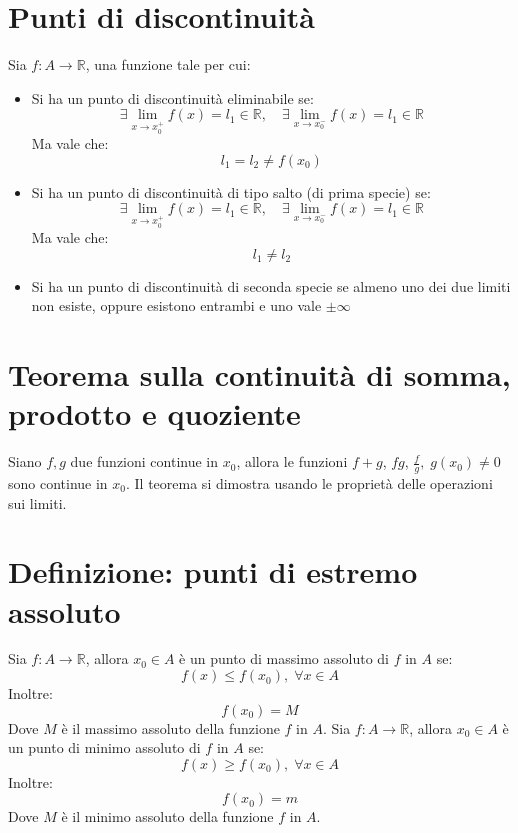 \documentclass[a4paper,12pt,openright]{book}
\begin{document}
    \section{Punti di discontinuità}
    Sia $f: A \longrightarrow \mathbb{R}$, una funzione tale per cui:
    \begin{itemize}
        \item Si ha un punto di discontinuità eliminabile se:
        \[\exists \lim_{x \rightarrow x_0^+} f(x) = l_1 \in \mathbb{R}, \quad \exists \lim_{x \rightarrow x_0^-} f(x) = l_1 \in \mathbb{R}\]
        Ma vale che:
        \[l_1 = l_2 \not = f(x_0)\]
        \item Si ha un punto di discontinuità di tipo salto (di prima specie) se:
        \[\exists \lim_{x \rightarrow x_0^+} f(x) = l_1 \in \mathbb{R}, \quad \exists \lim_{x \rightarrow x_0^-} f(x) = l_1 \in \mathbb{R}\]
        Ma vale che:
        \[l_1 \not = l_2\]       
        \item Si ha un punto di discontinuità di seconda specie se almeno uno dei due limiti non esiste, oppure esistono entrambi e uno vale $\pm\infty$
    \end{itemize}

    \section{Teorema sulla continuità di somma, prodotto e quoziente}
    Siano $f, g$ due funzioni continue in $x_0$, allora le funzioni $f + g$, $fg$, $\frac{f}{g}, \; g(x_0) \not = 0$ sono continue in $x_0$. Il teorema si dimostra usando le proprietà delle operazioni sui limiti.

    \section{Definizione: punti di estremo assoluto}
    Sia $f: A \longrightarrow \mathbb{R}$, allora $x_0 \in A$ è un punto di massimo assoluto di $f$ in $A$ se:
    \[f(x) \leq f(x_0), \; \forall x \in A\]
    Inoltre:
    \[f(x_0) = M\]
    Dove $M$ è il massimo assoluto della funzione $f$ in $A$. \newline
    Sia $f: A \longrightarrow \mathbb{R}$, allora $x_0 \in A$ è un punto di minimo assoluto di $f$ in $A$ se:
    \[f(x) \geq f(x_0), \; \forall x \in A\]
    Inoltre:
    \[f(x_0) = m\]
    Dove $M$ è il minimo assoluto della funzione $f$ in $A$.
\end{document}
